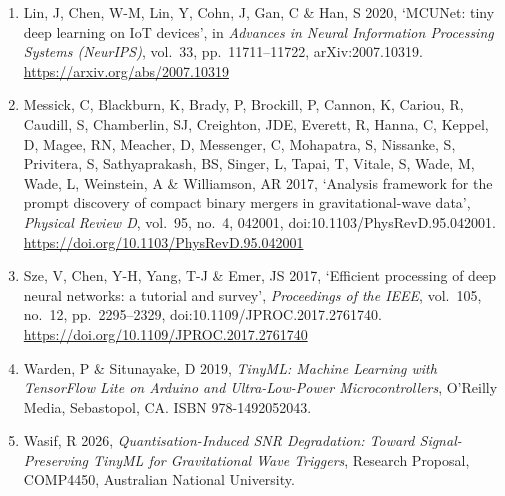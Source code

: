 \documentclass[11pt,a4paper]{article}
\begin{document}
\begin{enumerate}[label=\arabic*., start=19, leftmargin=2em]
\item Lin, J, Chen, W-M, Lin, Y, Cohn, J, Gan, C \& Han, S 2020, `MCUNet: tiny deep learning on IoT devices', in \textit{Advances in Neural Information Processing Systems (NeurIPS)}, vol.\ 33, pp.\ 11711--11722, arXiv:2007.10319. \url{https://arxiv.org/abs/2007.10319}
\item Messick, C, Blackburn, K, Brady, P, Brockill, P, Cannon, K, Cariou, R, Caudill, S, Chamberlin, SJ, Creighton, JDE, Everett, R, Hanna, C, Keppel, D, Magee, RN, Meacher, D, Messenger, C, Mohapatra, S, Nissanke, S, Privitera, S, Sathyaprakash, BS, Singer, L, Tapai, T, Vitale, S, Wade, M, Wade, L, Weinstein, A \& Williamson, AR 2017, `Analysis framework for the prompt discovery of compact binary mergers in gravitational-wave data', \textit{Physical Review D}, vol.\ 95, no.\ 4, 042001, doi:10.1103/PhysRevD.95.042001. \url{https://doi.org/10.1103/PhysRevD.95.042001}
\item Sze, V, Chen, Y-H, Yang, T-J \& Emer, JS 2017, `Efficient processing of deep neural networks: a tutorial and survey', \textit{Proceedings of the IEEE}, vol.\ 105, no.\ 12, pp.\ 2295--2329, doi:10.1109/JPROC.2017.2761740. \url{https://doi.org/10.1109/JPROC.2017.2761740}
\item Warden, P \& Situnayake, D 2019, \textit{TinyML: Machine Learning with TensorFlow Lite on Arduino and Ultra-Low-Power Microcontrollers}, O'Reilly Media, Sebastopol, CA. ISBN 978-1492052043.
\item Wasif, R 2026, \textit{Quantisation-Induced SNR Degradation: Toward Signal-Preserving TinyML for Gravitational Wave Triggers}, Research Proposal, COMP4450, Australian National University.
\end{enumerate}
\end{document}
